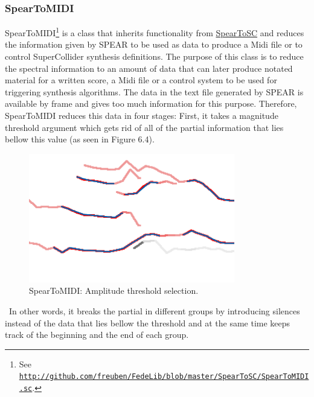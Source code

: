 \subsubsection{SpearToMIDI}

SpearToMIDI\footnote{See \href{http://github.com/freuben/FedeLib/blob/master/SpearToSC/SpearToMIDI.sc}{\texttt{http://github.com/freuben/FedeLib/blob/master/SpearToSC/SpearToMIDI.sc}}.} is a class that inherits functionality from \hyperlink{spearsc}{SpearToSC} and reduces the information given by SPEAR to be used as data to produce a Midi file or to control SuperCollider synthesis definitions. The purpose of this class is to reduce the spectral information to an amount of data that can later produce notated material for a written score, a Midi file or a control system to be used for triggering synthesis algorithms. The data in the text file generated by SPEAR is available by frame and gives too much information for this purpose. Therefore, SpearToMIDI reduces this data in four stages: First, it takes a magnitude threshold argument which gets rid of all of the partial information that lies bellow this value (as seen in Figure 6.4).
\begin{figure}[htbp] %
   \centering
   \includegraphics[width=9cm]{Chapter6/Spear2.tif} %
   \caption{SpearToMIDI: Amplitude threshold selection.}
   \label{fig:example}
\end{figure}\
In other words, it breaks the partial in different groups by introducing silences instead of the data that lies bellow the threshold and at the same time keeps track of the beginning and the end of each group. 

